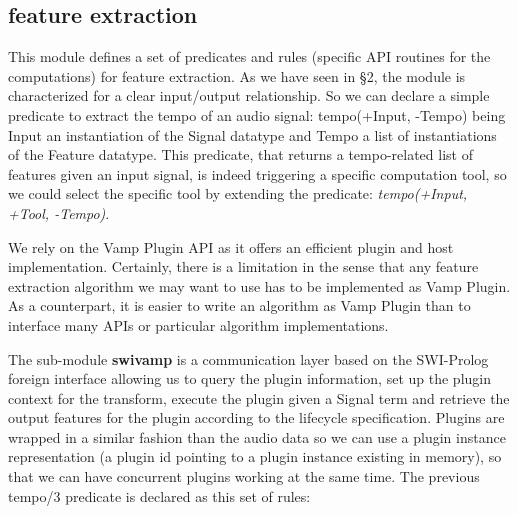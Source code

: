 \documentclass[runningheads]{llncs}
\begin{document}
\subsection{feature extraction}\label{subsec:swivamp}

This module defines a set of predicates and rules (specific API routines for the computations) for feature extraction. As we have seen in \S 2, the module is characterized for a clear input/output relationship. So we can declare a simple predicate to extract the tempo of an audio signal: tempo(+Input, -Tempo) being Input an instantiation of the Signal datatype and Tempo a list of instantiations of the Feature datatype. This predicate, that returns a tempo-related list of features given an input signal, is indeed triggering a specific computation tool, so we could select the specific tool by extending the predicate: \textit{tempo(+Input, +Tool, -Tempo)}.

We rely on the Vamp Plugin API as it offers an efficient plugin and host implementation. Certainly, there is a limitation in the sense that any feature extraction algorithm we may want to use has to be implemented as Vamp Plugin. As a counterpart, it is easier to write an algorithm as Vamp Plugin than to interface many APIs or particular algorithm implementations.

The sub-module \textbf{swivamp} is a communication layer based on the SWI-Prolog foreign interface allowing us to query the plugin information, set up the plugin context for the transform, execute the plugin given a Signal term and retrieve the output features for the plugin according to the lifecycle specification. Plugins are wrapped in a similar fashion than the audio data so we can use a plugin instance representation (a plugin id pointing to a plugin instance existing in memory), so that we can have concurrent plugins working at the same time. The previous tempo/3 predicate is declared as this set of rules:
\end{document}
